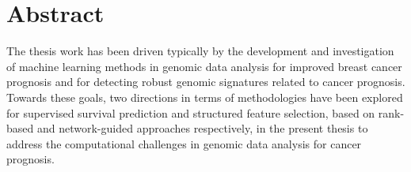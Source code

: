 \section*{Abstract}

The thesis work has been driven typically by the development and investigation of machine learning methods in genomic data analysis for improved breast cancer prognosis and for detecting robust genomic signatures related to cancer prognosis. Towards these goals, two directions in terms of methodologies have been explored for supervised survival prediction and structured feature selection, based on rank-based and network-guided approaches respectively, in the present thesis to address the computational challenges in genomic data analysis for cancer prognosis.